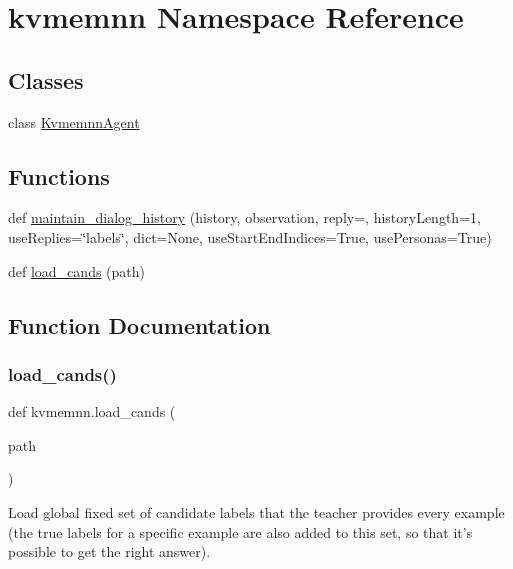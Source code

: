 \hypertarget{namespacekvmemnn}{}\section{kvmemnn Namespace Reference}
\label{namespacekvmemnn}
\subsection*{Classes}
\begin{DoxyCompactItemize}
\item 
class \hyperlink{classkvmemnn_1_1KvmemnnAgent}{Kvmemnn\+Agent}
\end{DoxyCompactItemize}
\subsection*{Functions}
\begin{DoxyCompactItemize}
\item 
def \hyperlink{namespacekvmemnn_a2a74a2753494bd274e31c8efd30f6067}{maintain\+\_\+dialog\+\_\+history} (history, observation, reply=\textquotesingle{}\textquotesingle{}, history\+Length=1, use\+Replies=\char`\"{}labels\char`\"{}, dict=None, use\+Start\+End\+Indices=True, use\+Personas=True)
\item 
def \hyperlink{namespacekvmemnn_abcca0290090a06f9273da1b1c7345c9d}{load\+\_\+cands} (path)
\end{DoxyCompactItemize}


\subsection{Function Documentation}
\mbox{\label{namespacekvmemnn_abcca0290090a06f9273da1b1c7345c9d}} 
\subsubsection{\texorpdfstring{load\+\_\+cands()}{load\_cands()}}
{\footnotesize\ttfamily def kvmemnn.\+load\+\_\+cands (\begin{DoxyParamCaption}\item[{}]{path }\end{DoxyParamCaption})}

\begin{DoxyVerb}Load global fixed set of candidate labels that the teacher provides
every example (the true labels for a specific example are also added to
this set, so that it's possible to get the right answer).
\end{DoxyVerb}
 

